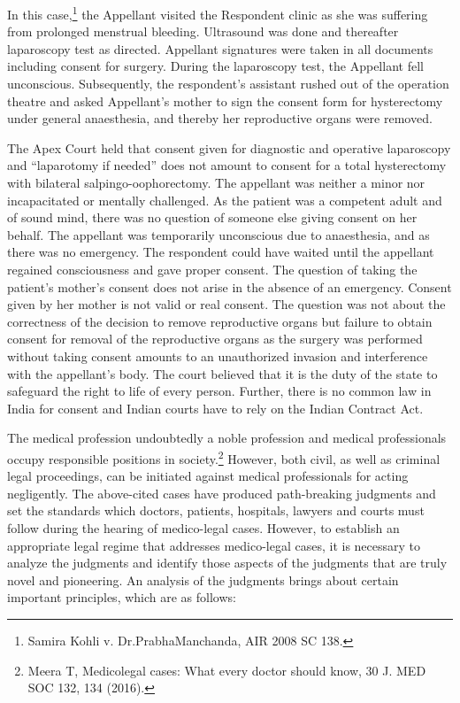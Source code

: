 \begin{multicols}{2}

\vspace{-.1cm}

\noi
In this case,\footnote{Samira Kohli v. Dr.PrabhaManchanda, AIR 2008 SC 138.} the Appellant visited the Respondent clinic as she was suffering from prolonged
menstrual bleeding. Ultrasound was done and thereafter laparoscopy test as directed. Appellant
signatures were taken in all documents including consent for surgery. During the laparoscopy
test, the Appellant fell unconscious. Subsequently, the respondent’s assistant rushed out of the
operation theatre and asked Appellant’s mother to sign the consent form for hysterectomy under
general anaesthesia, and thereby her reproductive organs were removed.

\noi
The Apex Court held that consent given for diagnostic and operative laparoscopy and
“laparotomy if needed” does not amount to consent for a total hysterectomy with bilateral
salpingo-oophorectomy. The appellant was neither a minor nor incapacitated or mentally
challenged. As the patient was a competent adult and of sound mind, there was no question of
someone else giving consent on her behalf. The appellant was temporarily unconscious due to
anaesthesia, and as there was no emergency. The respondent could have waited until the appellant
regained consciousness and gave proper consent. The question of taking the patient's mother's
consent does not arise in the absence of an emergency. Consent given by her mother is not valid
or real consent. The question was not about the correctness of the decision to remove reproductive
organs but failure to obtain consent for removal of the reproductive organs as the surgery was
performed without taking consent amounts to an unauthorized invasion and interference with the
appellant's body. The court believed that it is the duty of the state to safeguard the right to life of
every person. Further, there is no common law in India for consent and Indian courts have to rely
on the Indian Contract Act.


\noi
The medical profession undoubtedly a noble profession and medical professionals occupy
responsible positions in society.\footnote{Meera T, Medicolegal cases: What every doctor should know, 30 J. MED SOC 132, 134 (2016).} However, both civil, as well as criminal legal proceedings, can
be initiated against medical professionals for acting negligently. The above-cited cases have
produced path-breaking judgments and set the standards which doctors, patients, hospitals, 
lawyers and courts must follow during the hearing of medico-legal cases. However, to establish
an appropriate legal regime that addresses medico-legal cases, it is necessary to analyze the
judgments and identify those aspects of the judgments that are truly novel and pioneering. An
analysis of the judgments brings about certain important principles, which are as follows:


\end{multicols}
